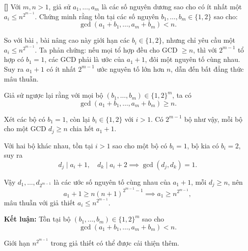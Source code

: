 \documentclass[../01-divisibility.tex]{subfiles}
\begin{document}

\newpage

\begin{example*}\label{example:EGMO-2015-P3-strong}\textbf{[]}
	Với \( m, n > 1 \), giả sử \( a_1, \dots, a_m \) là các số nguyên dương sao cho có ít nhất một \( a_i \leq n^{2^{m-1}} \). 
	Chứng minh rằng tồn tại các số nguyên \( b_1, \dots, b_m \in \{1, 2\} \) sao cho:
	\[
		\gcd(a_1 + b_1, \dots, a_m + b_m) < n.
	\]
\end{example*}

\begin{story*}
	So với bài , bài nâng cao này giới hạn các \( b_i \in \{1, 2\} \), nhưng chỉ yêu cầu một \( a_i \leq n^{2^{m-1}} \).  
	Ta phản chứng: nếu mọi tổ hợp đều cho GCD \( \geq n \), thì với \( 2^{m-1} \) tổ hợp có \( b_1 = 1 \), các GCD phải là ước của \( a_1 + 1 \), đôi một nguyên tố cùng nhau.  
	Suy ra \( a_1 + 1 \) có ít nhất \( 2^{m-1} \) ước nguyên tố lớn hơn \( n \), dẫn đến bất đẳng thức mâu thuẫn.
\end{story*}

\begin{soln}\footnotemark
	Giả sử ngược lại rằng với mọi bộ \( (b_1, \dots, b_m) \in \{1, 2\}^m \), ta có
	\[
		\gcd(a_1 + b_1, \dots, a_m + b_m) \geq n.
	\]

	Xét các bộ có \( b_1 = 1 \), còn lại \( b_i \in \{1, 2\} \) với \( i > 1 \). Có \( 2^{m-1} \) bộ như vậy, mỗi bộ cho một GCD \( d_j \geq n \) chia hết \( a_1 + 1 \).

	Với hai bộ khác nhau, tồn tại \( i > 1 \) sao cho một bộ có \( b_i = 1 \), bộ kia có \( b_i = 2 \), suy ra
	\[
		d_j \mid a_i + 1,\quad d_k \mid a_i + 2 \implies \gcd(d_j, d_k) = 1.
	\]

	Vậy \( d_1, \dots, d_{2^{m-1}} \) là các ước số nguyên tố cùng nhau của \( a_1 + 1 \), mỗi \( d_j \geq n \), nên
	\[
		a_1 + 1 \geq n(n+1)^{2^{m-1} - 1} \implies a_1 \geq n^{2^{m-1}},
	\]
	mâu thuẫn với giả thiết \( a_i \leq n^{2^{m-1}} \).

	\textbf{Kết luận:} Tồn tại bộ \( (b_1, \dots, b_m) \in \{1, 2\}^m \) sao cho
	\[
		\gcd(a_1 + b_1, \dots, a_m + b_m) < n.
	\]
\end{soln}

\begin{remark*}
	Giới hạn \( n^{2^{m-1}} \) trong giả thiết có thể được cải thiện thêm.
\end{remark*}

\end{document}
